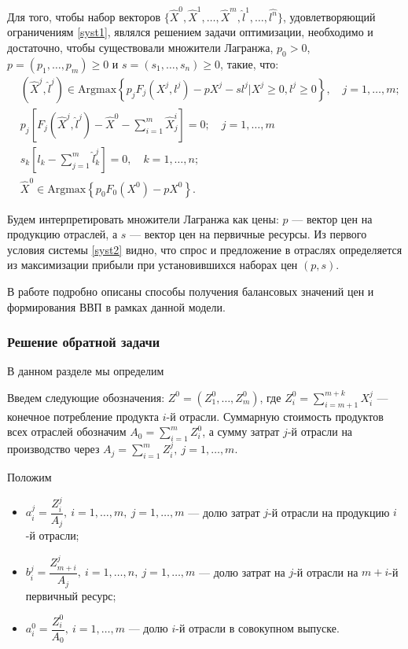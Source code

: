 \documentclass[12pt, a4paper]{article}
\begin{document}
Для того, чтобы набор векторов $\{\hat{X}^0, \hat{X}^1, \ldots, \hat{X}^m, \hat{l}^1, \ldots, \hat{l^n}\}$, удовлетворяющий ограничениям \eqref{syst1}, являлся решением задачи оптимизации, необходимо и достаточно, чтобы существовали множители Лагранжа, $p_0 > 0$, $p = (p_1, \ldots, p_m) \geq 0$ и $s = (s_1, \ldots, s_n) \geq 0$, такие, что:
\begin{equation}\label{syst2}
\begin{aligned}
&(\hat{X}^j, \hat{l}^j) \in \text{Argmax}\left\{p_jF_j(X^j, l^j) - p X^j - sl^j \Biggl|X^j \geq 0, l^j \geq 0\right\},\quad j = 1,\ldots, m;\\
&p_j\left[F_j(\hat{X}^j, \hat{l}^j) - \hat{X}^0 - \sum\limits_{i=1}^{m}\hat{X}^i_j\right] = 0;\quad j=1,\ldots, m\\
&s_k\left[l_k - \sum\limits_{j=1}^m \hat{l}^j_k\right] = 0,\quad k = 1,\ldots,n;\\
&\hat{X}^0 \in \text{Argmax}\left\{p_0F_0(X^0) - pX^0\right\}.
\end{aligned}
\end{equation}

Будем интерпретировать множители Лагранжа как цены: $p$ --- вектор цен на продукцию отраслей, а $s$ --- вектор цен на первичные ресурсы. Из первого условия системы \eqref{syst2} видно, что спрос и предложение в отраслях определяется из максимизации прибыли при установившихся наборах цен $(p, s)$.

В работе \cite{Inverse_Shan} подробно описаны способы получения балансовых значений цен и формирования ВВП в рамках данной модели.


\subsubsection{Решение обратной задачи}

В данном разделе мы определим 

Введем следующие обозначения: $Z^0 = (Z^0_1,\ldots, Z^0_m)$, где $Z^0_i = \sum\limits_{i=m+1}^{m+k} X^j_i$ --- конечное потребление продукта $i$-й отрасли. Суммарную стоимость продуктов всех отраслей обозначим $A_0 = \sum\limits_{i=1}^mZ^0_i$, а сумму затрат $j$-й отрасли на производство через $A_j = \sum\limits_{i=1}^m Z^j_i,\ j=1,\ldots,m$.

Положим
\begin{itemize}
\item $a^j_i = \dfrac{Z^j_i}{A_j},\ i=1,\ldots,m,\ j=1,\ldots,m$ --- долю затрат $j$-й отрасли на продукцию $i$-й отрасли;
\item $b^j_i = \dfrac{Z^j_{m+i}}{A_j},\ i=1,\ldots,n,\ j=1,\ldots,m$ --- долю затрат на $j$-й отрасли на $m+i$-й первичный ресурс;
\item $a^0_i = \dfrac{Z^0_i}{A_0},\ i=1,\ldots,m$ --- долю $i$-й отрасли в совокупном выпуске.
\end{itemize}
\end{document}
